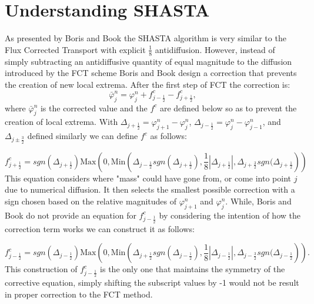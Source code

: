 \documentclass[]{article}
\begin{document}
\section{Understanding SHASTA}
As presented by Boris and Book \cite{shasta} the SHASTA algorithm is very similar to the Flux Corrected Transport with explicit $\frac{1}{8}$ antidiffusion. However, instead of simply subtracting an antidiffusive quantity of equal magnitude to the diffusion introduced by the FCT scheme Boris and Book design a correction that prevents the creation of new local extrema. After the first step of FCT the correction is:
\begin{equation}
\bar{\varphi}^n_j = \varphi_j^n + f^c_{j-\frac{1}{2}}-f^c_{j+\frac{1}{2}},
\end{equation}
where $\bar{\varphi}^n_j$ is the corrected value and the $f^c$ are defined below so as to prevent the creation of local extrema. With $\Delta_{j+\frac{1}{2}} = \varphi^n_{j+1} - \varphi^n_{j}$, $\Delta_{j-\frac{1}{2}} = \varphi^n_{j} - \varphi^n_{j-1}$, and $\Delta_{j\pm\frac{3}{2}}$ defined similarly we can define $f^c$ as follows:

\begin{equation}
f^c_{j+\frac{1}{2}} = sgn(\Delta_{j+\frac{1}{2}}) \text{Max}\left(0,\text{Min}\left(\Delta_{j-\frac{1}{2}} sgn(\Delta_{j+\frac{1}{2}}), \frac{1}{8}|\Delta_{j+\frac{1}{2}}|,\Delta_{j+\frac{3}{2}} sgn(\Delta_{j+\frac{1}{2}}\right)\right)
\label{eq:def_fc_right}
\end{equation}
This equation considers where "mass" could have gone from, or come into point $j$ due to numerical diffusion. It then selects the smallest possible correction with a sign chosen based on the relative magnitudes of $\varphi^n_{j+1}$ and $\varphi^n_{j}$. While, Boris and Book do not provide an equation for $f^c_{j-\frac{1}{2}}$ by considering the intention of how the correction term works we can construct it as follows:

\begin{equation}
f^c_{j-\frac{1}{2}} = sgn(\Delta_{j-\frac{1}{2}}) \text{Max}\left(0,\text{Min}\left(\Delta_{j+\frac{1}{2}} sgn(\Delta_{j-\frac{1}{2}}), \frac{1}{8}|\Delta_{j-\frac{1}{2}}|,\Delta_{j-\frac{3}{2}} sgn(\Delta_{j-\frac{1}{2}}\right)\right).
\label{eq:def_fc_left}
\end{equation}
This construction of $f^c_{j-\frac{1}{2}}$ is the only one that maintains the symmetry of the corrective equation, simply shifting the subscript values by -1 would not be result in proper correction to the FCT method. 
\end{document}
